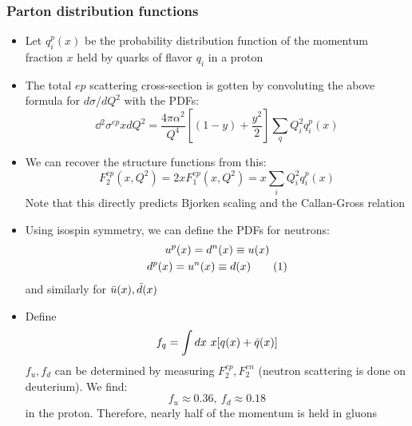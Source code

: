 \subsubsection{Parton distribution functions}
\begin{itemize}
  \item Let $q_i^p(x)$ be the probability distribution function of the momentum fraction $x$ held by quarks of flavor $q_i$ in a proton
  \item The total $ep$ scattering cross-section is gotten by convoluting the above formula for $d\sigma/dQ^2$ with the PDFs:
  \begin{equation}
    \dd{^2\sigma^{ep}}{xdQ^2} = \frac{4\pi \alpha^2}{Q^4} \left[(1-y)+\frac{y^2}{2}\right] \sum_q Q_i^2 q_i^p(x)
  \end{equation}
  \item We can recover the structure functions from this:
  \begin{equation}
    F_2^{ep}(x,Q^2) = 2xF_1^{ep}(x,Q^2) = x\sum_i Q_i^2 q_i^p(x)
  \end{equation}
  Note that this directly predicts Bjorken scaling and the Callan-Gross relation
  \item Using isospin symmetry, we can define the PDFs for neutrons:
  \begin{gather*}
    u^p(x) = d^n(x) \equiv u(x)\\
    d^p(x) = u^n(x) \equiv d(x)\numberthis
  \end{gather*}
  and similarly for $\bar{u}(x),\bar{d}(x)$
  \item Define
  \begin{equation}
    f_q = \int dx~x[q(x)+{\bar{q}}(x)]
  \end{equation}
  $f_u,f_d$ can be determined by measuring $F_2^{ep},F_2^{en}$ (neutron scattering is done on deuterium). We find:
  \begin{equation}
    f_u \approx 0.36,~f_d \approx 0.18
  \end{equation}
  in the proton. Therefore, nearly half of the momentum is held in gluons
\end{itemize}

